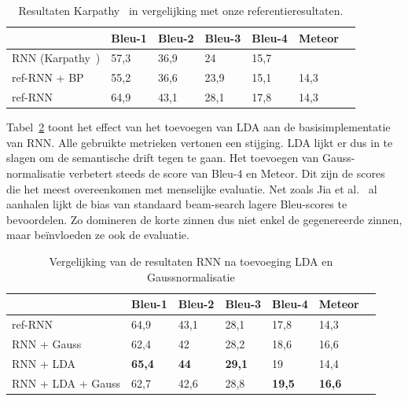 \begin{table}
	\centering
	\begin{tabular}{lllllll}
		& Bleu-1 & Bleu-2 & Bleu-3 & Bleu-4 & Meteor \\ \hline
		RNN (Karpathy~\cite{Karpathy2015})    & 57,3   & 36,9   & 24     & 15,7   & ~           \\    
		ref-RNN + BP     & 55,2   & 36,6   & 23,9   & 15,1   & 14,3          \\
		ref-RNN          & 64,9  & 43,1     & 28,1   & 17,8   & 14,3          \\\hline
	\end{tabular}

	\caption{Resultaten Karpathy~\cite{Karpathy2015} in vergelijking met onze referentieresultaten.}
	\label{table:karpathy_met_bp}
\end{table}

Tabel~\ref{table:rnn_met_lda} toont het effect van het toevoegen van LDA aan de basisimplementatie van RNN. Alle gebruikte metrieken vertonen een stijging. LDA lijkt er dus in te slagen om de semantische drift tegen te gaan.
Het toevoegen van Gauss-normalisatie verbetert steeds de score van Bleu-4 en Meteor. Dit zijn de scores die het meest overeenkomen met menselijke evaluatie. Net zoals Jia et al.~\cite{Fernando2015} al aanhalen lijkt de bias van standaard beam-search lagere Bleu-scores te bevoordelen. Zo domineren de korte zinnen dus niet enkel de gegenereerde zinnen, maar be\"invloeden ze ook de evaluatie.

\begin{table}
	\centering
	\begin{tabular}{lllllll}
		& Bleu-1 & Bleu-2 & Bleu-3 & Bleu-4 & Meteor \\ \hline
		ref-RNN        & 64,9   & 43,1   & 28,1   & 17,8   & 14,3          \\
		RNN + Gauss       & 62,4   & 42     & 28,2   & 18,6   & 16,6          \\
		RNN + LDA         & \textbf{65,4}   & \textbf{44}     & \textbf{29,1}   & 19     & 14,4          \\
		RNN + LDA + Gauss & 62,7   & 42,6   & 28,8   & \textbf{19,5}   & \textbf{16,6}          \\ \hline
	\end{tabular}
	\caption{Vergelijking van de resultaten RNN na toevoeging LDA en Gaussnormalisatie}	
	\label{table:rnn_met_lda}
\end{table}


